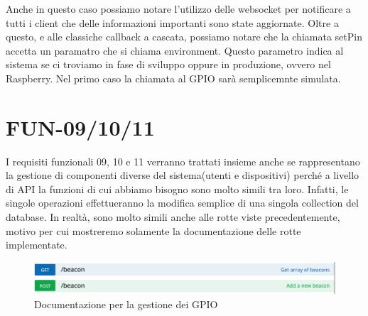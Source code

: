Anche in questo caso possiamo notare l'utilizzo delle websocket per notificare a tutti i client che delle informazioni importanti sono state aggiornate.
Oltre a questo, e alle classiche callback a cascata, possiamo notare che la chiamata setPin accetta un paramatro che si chiama environment.
Questo parametro indica al sistema se ci troviamo in fase di sviluppo oppure in produzione, ovvero nel Raspberry.
Nel primo caso la chiamata al GPIO sarà semplicemnte simulata.

\section{FUN-09/10/11}
I requisiti funzionali 09, 10 e 11 verranno trattati insieme anche se rappresentano la gestione di componenti diverse del sistema(utenti e dispositivi) perché a livello di API la funzioni di cui abbiamo bisogno sono molto simili tra loro. 
Infatti, le singole operazioni effettueranno la modifica semplice di una singola collection del database.
In realtà, sono molto simili anche alle rotte viste precedentemente, motivo per cui mostreremo solamente la documentazione delle rotte implementate.

\begin{figure}[h]
\centering
\includegraphics[width=1\textwidth]{API/beacon_03.png} 
\caption{Documentazione per la gestione dei GPIO}
\label{fig:user:login}
\end{figure}
